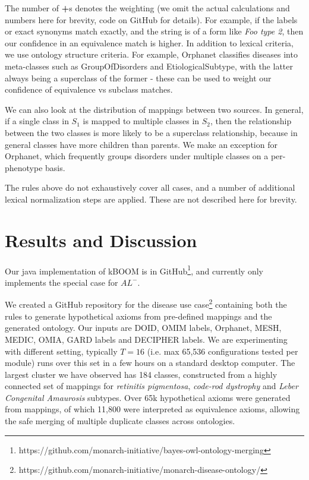 \documentclass{my}
\begin{document}
The number of \textbf{+}s denotes the weighting (we omit the actual
calculations and numbers here for brevity, code on GitHub for
details). For example, if the labels or exact synonyms match exactly,
and the string is of a form like \emph{Foo type 2}, then our confidence
in an equivalence match is higher. In addition to lexical criteria, we
use ontology structure criteria. For example, Orphanet classifies
diseases into meta-classes such as GroupOfDisorders and
EtiologicalSubtype, with the latter always being a superclass of the
former - these can be used to weight our confidence of equivalence vs
subclass matches.

We can also look at the distribution of mappings between two
sources. In general, if a single class in $S_1$ is mapped to multiple
classes in $S_2$, then the relationship between the two classes is
more likely to be a superclass relationship, because in general
classes have more children than parents. We make an exception for
Orphanet, which frequently groups disorders under multiple classes on
a per-phenotype basis.

The rules above do not exhaustively cover all cases, and a number of
additional lexical normalization steps are applied. These are not
described here for brevity.

\section{Results and Discussion}

Our java implementation of kBOOM is in
GitHub\footnote{https://github.com/monarch-initiative/bayes-owl-ontology-merging},
and currently only implements the special case for $AL^{-}$.

We created a GitHub repository for the disease use
case\footnote{https://github.com/monarch-initiative/monarch-disease-ontology/}
containing both the rules to generate hypothetical axioms from
pre-defined mappings and the generated ontology. Our inputs are DOID,
OMIM labels, Orphanet, MESH, MEDIC, OMIA, GARD labels and DECIPHER
labels. We are experimenting with different setting, typically $T=16$
(i.e. max 65,536 configurations tested per module) runs over this set
in a few hours on a standard desktop computer. The largest cluster we
have observed has 184 classes, constructed from a highly connected set
of mappings for \emph{retinitis pigmentosa}, \emph{code-rod dystrophy} and \emph{Leber
Congenital Amaurosis} subtypes. Over 65k hypothetical axioms were
generated from mappings, of which 11,800 were interpreted as
equivalence axioms, allowing the safe merging of multiple duplicate
classes across ontologies.
\end{document}
